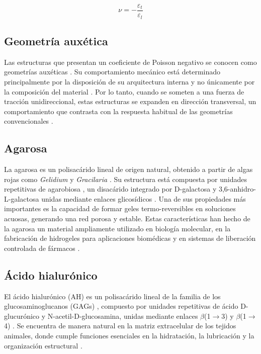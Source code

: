 \documentclass[../../DocumentoCompleto.tex]{subfiles}
\begin{document}
\begin{equation}
\nu = - \frac{\varepsilon_{t}}{\varepsilon_{l}}
\label{poisson}
\end{equation}

  \subsection{Geometría auxética}
 Las estructuras que presentan un coeficiente de Poisson negativo se conocen como geometrías auxéticas \cite{Ebert2024}. Su comportamiento mecánico está determinado principalmente por la disposición de su arquitectura interna y no únicamente por la composición del material \cite{Yolcu2022}. Por lo tanto, cuando se someten a una fuerza de tracción unidireccional, estas estructuras se expanden en dirección transversal, un comportamiento que contrasta con la respuesta habitual de las geometrías convencionales \cite{Winczewski2022}.
  
  \subsection{Agarosa}
  La agarosa es un polisacárido lineal de origen natural, obtenido a partir de algas rojas como \textit{Gelidium} y \textit{Gracilaria} \cite{Mantri2021}. Su estructura está compuesta por unidades repetitivas de agarobiosa \cite{Roux2023}, un disacárido integrado por D-galactosa y 3,6-anhidro-L-galactosa unidas mediante enlaces glicosídicos \cite{Shen2024}. Una de sus propiedades más importantes es la capacidad de formar geles termo-reversibles en soluciones acuosas, generando una red porosa y estable. Estas características han hecho de la agarosa un material ampliamente utilizado en biología molecular, en la fabricación de hidrogeles para aplicaciones biomédicas y en sistemas de liberación controlada de fármacos \cite{Jiang2023}.
  
  \subsection{Ácido hialurónico}
El ácido hialurónico (AH) es un polisacárido lineal de la familia de los glucosaminoglucanos (GAGs) \cite{Yasin2022}, compuesto por unidades repetitivas de ácido D-glucurónico y N-acetil-D-glucosamina, unidas mediante enlaces $\beta$(1$\to$3) y $\beta$(1$\to$4) \cite{Lee2021}. Se encuentra de manera natural en la matriz extracelular de los tejidos animales, donde cumple funciones esenciales en la hidratación, la lubricación y la organización estructural \cite{Ding2022}.
\end{document}
